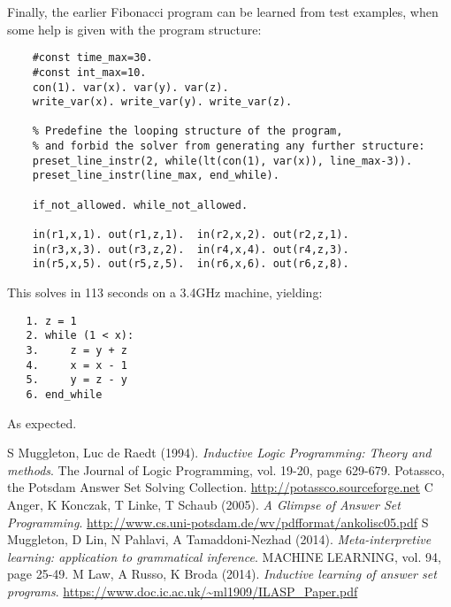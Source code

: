 \documentclass[a4paper,twoside,notitlepage]{article}
\begin{document}
Finally, the earlier Fibonacci program can be learned from test examples, 
when some help is given with the program structure:
\begin{verbatim}
    #const time_max=30.
    #const int_max=10.
    con(1). var(x). var(y). var(z).
    write_var(x). write_var(y). write_var(z).
    
    % Predefine the looping structure of the program,
    % and forbid the solver from generating any further structure:
    preset_line_instr(2, while(lt(con(1), var(x)), line_max-3)).
    preset_line_instr(line_max, end_while).
    
    if_not_allowed. while_not_allowed.
    
    in(r1,x,1). out(r1,z,1).  in(r2,x,2). out(r2,z,1).
    in(r3,x,3). out(r3,z,2).  in(r4,x,4). out(r4,z,3).
    in(r5,x,5). out(r5,z,5).  in(r6,x,6). out(r6,z,8).
\end{verbatim}
This solves in 113 seconds on a 3.4GHz machine, yielding:
\begin{verbatim}
   1. z = 1
   2. while (1 < x):
   3.     z = y + z
   4.     x = x - 1
   5.     y = z - y
   6. end_while
\end{verbatim}
As expected.

\begin{thebibliography}{9}
        S Muggleton, Luc de Raedt (1994). \emph{Inductive Logic Programming: 
        Theory and methods}. The Journal of Logic Programming, vol. 19-20, page 
        629-679.
        Potassco, the Potsdam Answer Set Solving Collection. 
        \url{http://potassco.sourceforge.net}
        C Anger, K Konczak, T Linke, T Schaub (2005). \emph{A 
        Glimpse of Answer Set Programming}. 
        \url{http://www.cs.uni-potsdam.de/wv/pdfformat/ankolisc05.pdf}
        S Muggleton, D Lin, N Pahlavi, A Tamaddoni-Nezhad (2014). 
        \emph{Meta-interpretive learning: application to grammatical inference}.
        MACHINE LEARNING, vol. 94, page 25-49.
        M Law, A Russo, K Broda (2014). \emph{Inductive learning of answer set 
        programs}. \url{https://www.doc.ic.ac.uk/~ml1909/ILASP_Paper.pdf}
\end{thebibliography}
\end{document}
